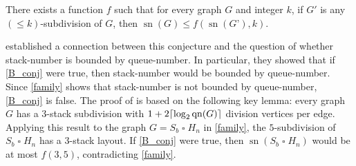 \documentclass[kpfonts]{patmorin}
\DeclareMathOperator{\sn}{sn}
\DeclareMathOperator{\qn}{qn}
\renewcommand{\leq}{\leqslant}
\newcommand{\CartProd}{\mathbin{\square}}
\begin{document}
\begin{conj}[\citep{BO99}]
\label{B_conj}
There exists a function $f$ such that for every graph $G$ and integer $k$, if $G'$ is any $(\leq k)$-subdivision of $G$, then $\sn(G) \leq f(\sn(G’),k)$.
\end{conj}

\citet{DujWoo05} established a connection between this conjecture and the question of whether stack-number is bounded by queue-number. In particular, they showed that if
\cref{B_conj} were true, then stack-number would be bounded by queue-number. Since \cref{family} shows that stack-number is not bounded by queue-number, \cref{B_conj} is false. The proof of \citet{DujWoo05} is based on the following key lemma: every graph $G$ has a $3$-stack subdivision with $1+2 \ceil{\log_2\qn(G)}$ division vertices per edge. Applying this result to the graph $G=S_b\CartProd H_n$ in \cref{family},
the $5$-subdivision of $S_b\CartProd H_n$ has a $3$-stack layout. If \cref{B_conj} were true, then  $\sn(S_b\CartProd H_n)$ would be at most $f( 3,5)$, contradicting \cref{family}.




\end{document}
